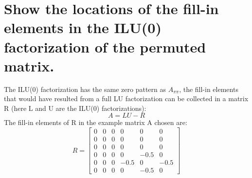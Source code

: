 \documentclass[letterpaper,10pt]{article}
\newcommand{\bes}{\begin{equation*}}
\newcommand{\ees}{\end{equation*}}
\begin{document}
\section*{Show the locations of the fill-in elements in the ILU(0) factorization of the permuted matrix.}
The ILU(0) factorization has the same zero pattern as $A_{\pi\pi}$, the fill-in elements that would have resulted from a full LU factorization can be collected in a matrix R (here L and U are the ILU(0) factorizations):
\bes A=LU-R \ees
The fill-in elements of R in the example matrix A chosen are:
\bes
R=
\begin{bmatrix}
 0&  0&  0&  0&  0&0 \\ 
 0&  0&  0&  0&  0&0 \\ 
 0&  0&  0&  0&  0&0 \\ 
 0&  0&  0&  0&  -0.5&0 \\ 
 0&  0&  0&  -0.5&  0&-0.5 \\ 
 0&  0&  0&  0&  -0.5&0 
\end{bmatrix}
\ees
\end{document}
